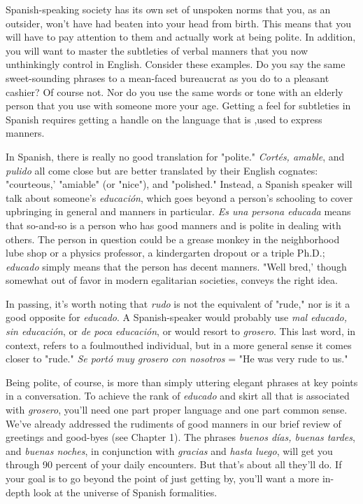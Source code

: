 \documentclass[14pt,a4paper,oneside]{memoir}
\begin{document}
Spanish-speaking society has its own set of unspoken norms
that you, as an outsider, won't have had beaten into your head from
birth. This means that you will have to pay attention to them and actually work at being polite. In addition, you will want to master the
subtleties of verbal manners that you now unthinkingly control in English. Consider these examples. Do you say the same sweet-sounding
phrases to a mean-faced bureaucrat as you do to a pleasant cashier? Of
course not. Nor do you use the same words or tone with an elderly
person that you use with someone more your age. Getting a feel for
subtleties in Spanish requires getting a handle on the language that is
,used to express manners.

In Spanish, there is really no good translation for "polite."
\emph{Cortés, amable}, and \emph{pulido} all come close but are better translated by
their English cognates: "courteous,' "amiable" (or "nice"), and "polished." Instead, a Spanish speaker will talk about someone's \emph{educación}, which goes beyond a person's schooling to cover upbringing in
general and manners in particular. \emph{Es una persona educada} means that
so-and-so is a person who has good manners and is polite in dealing
with others. The person in question could be a grease monkey in the
neighborhood lube shop or a physics professor, a kindergarten dropout
or a triple Ph.D.; \emph{educado} simply means that the person has decent
manners. "Well bred,' though somewhat out of favor in modern egalitarian societies, conveys the right idea.

In passing, it's worth noting that \emph{rudo} is not the equivalent of
"rude," nor is it a good opposite for \emph{educado}. A Spanish-speaker would
probably use \emph{mal educado, sin educación}, or \emph{de poca educación}, or
would resort to \emph{grosero}. This last word, in context, refers to a foulmouthed individual, but in a more general sense it comes closer to
"rude." \emph{Se portó muy grosero con nosotros} = "He was very rude
to us."

Being polite, of course, is more than simply uttering elegant
phrases at key points in a conversation. To achieve the rank of \emph{educado} and skirt all that is associated with \emph{grosero}, you'll need one part
proper language and one part common sense. We've already addressed
the rudiments of good manners in our brief review of greetings and
good-byes (see Chapter 1). The phrases \emph{buenos días, buenas tardes},
and \emph{buenas noches}, in conjunction with \emph{gracias} and \emph{hasta luego},
will get you through 90 percent of your daily encounters. But that's
about all they'll do. If your goal is to go beyond the point of just getting by, you'll want a more in-depth look at the universe of Spanish
formalities.
\end{document}

